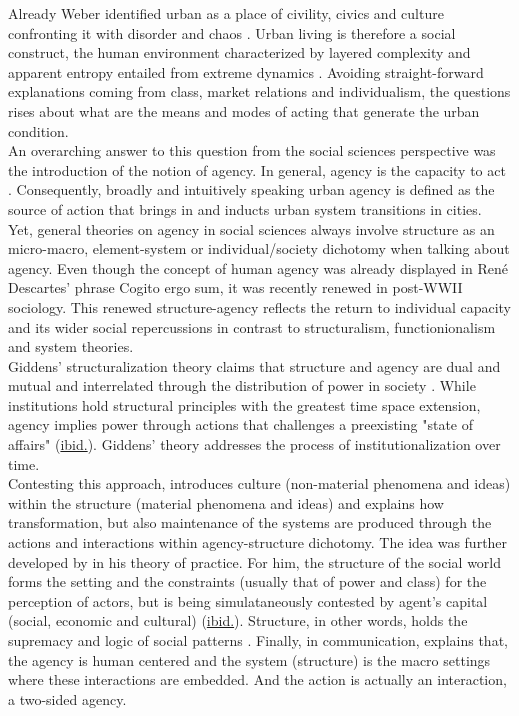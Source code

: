 \documentclass[11pt]{report}
\begin{document}
Already Weber identified  urban as a place of civility, civics and culture confronting it with disorder and chaos \cite{Weber ???}. Urban living is therefore a social construct, the human environment characterized by layered complexity and apparent entropy entailed from extreme dynamics \cite{(Jacobs 2000)}.
Avoiding straight-forward explanations coming from class, market relations and  individualism, the questions rises about what are the means and modes of acting that generate the urban condition.
\\
An overarching answer to this question from the social sciences perspective was the introduction of the notion of agency.
In general, agency is the capacity to act \cite{dictionary????}.
Consequently, broadly and intuitively speaking urban agency is defined as the source of action that brings in and inducts urban system transitions in cities.
\\

Yet, general theories on agency in social sciences always involve structure as an micro-macro, element-system or individual/society dichotomy when talking about agency.
Even though the concept of human agency was already displayed in René Descartes' phrase Cogito ergo sum, it was recently renewed in post-WWII sociology.
This renewed structure-agency reflects the return to individual capacity and its wider social repercussions in contrast to structuralism, functionionalism and system theories.
\\

Giddens' structuralization theory claims that structure and agency are dual and mutual and interrelated through the distribution of power in society \cite{Giddens constitution of society}.
While institutions hold structural principles with the greatest time space extension, agency implies power through actions that challenges a preexisting "state of affairs" (\href{Giddens}{ibid.}).
Giddens' theory addresses the process of institutionalization over time.
\\

Contesting this approach, \cite{Archer (1982)???} introduces culture (non-material phenomena and ideas) within the structure (material phenomena and ideas) and explains how transformation, but also maintenance of the systems are produced through the actions and interactions within agency-structure dichotomy.
The idea was further developed by \cite{Bourdieu (XXX)} in his theory of practice.
For him, the structure of the social world forms the setting and the constraints (usually that of power and class) for the perception of actors, but is being simulataneously contested by agent's capital (social, economic and cultural) (\href{Bourdieu}{ibid.}).
Structure, in other words, holds the supremacy and logic of social patterns \cite{Rafiee}.
Finally, in communication, \cite{Habermas (XXXX)} explains that, the agency is human centered and the system (structure) is the macro settings where these interactions are embedded. And the action is actually an interaction, a two-sided agency.
\\
\end{document}
